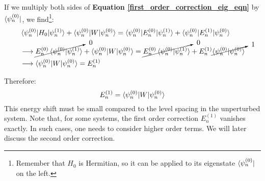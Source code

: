 If we multiply both sides of \textbf{Equation \ref{first_order_correction_eig_eqn}} by $\bra{\psi_n^{(0)}}$, we find\footnote{Remember that $H_0$ is Hermitian, so it can be applied to its eigenstate $\bra{\psi_n^{(0)}}$ on the left.}:
\begin{equation}
    \begin{split}
        &\braket{\psi_n^{(0)}|H_0|\psi_n^{(1)}} + \braket{\psi_n^{(0)}|W|\psi_n^{(0)}} = \braket{\psi_n^{(0)}|E_n^{(0)}|\psi_n^{(1)}} + \braket{\psi_n^{(0)}|E_n^{(1)}|\psi_n^{(0)}}\\
        &\longrightarrow \cancelto{\ 0}{E_n^{(0)}\braket{\psi_n^{(0)}|\psi_n^{(1)}}} + \braket{\psi_n^{(0)}|W|\psi_n^{(0)}} = \cancelto{\ 0}{E_n^{(0)}\braket{\psi_n^{(0)}|\psi_n^{(1)}}} + E_n^{(1)}\cancelto{\ 1}{\braket{\psi_n^{(0)}|\psi_n^{(0)}}} \\
        &\longrightarrow \braket{\psi_n^{(0)}|W|\psi_n^{(0)}} = E_n^{(1)}
    \end{split}
\end{equation}

Therefore:
\begin{equation}
    E_n^{(1)} = \braket{\psi_n^{(0)}|W|\psi_n^{(0)}}
\end{equation}
This energy shift must be small compared to the level spacing in the unperturbed system. Note that, for some systems, the first order correction $E_n^{(1)}$ vanishes exactly. In such cases, one needs to consider higher order terms. We will later discuss the second order correction.

